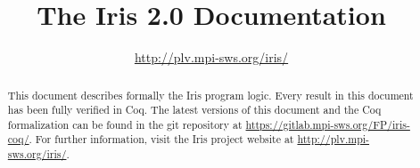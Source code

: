 \documentclass[10pt]{article}
\title{\bfseries The Iris 2.0 Documentation}
\author{\url{http://plv.mpi-sws.org/iris/}}
\begin{document}
\maketitle
\thispagestyle{empty}
\vfill
\begin{abstract}
This document describes formally the Iris program logic.
Every result in this document has been fully verified in Coq.
The latest versions of this document and the Coq formalization can be found in the git repository at \url{https://gitlab.mpi-sws.org/FP/iris-coq/}.
For further information, visit the Iris project website at \url{http://plv.mpi-sws.org/iris/}.
\end{abstract}

\clearpage
\tableofcontents

\clearpage\begingroup

\endgroup\clearpage\begingroup

\endgroup\clearpage\begingroup

\endgroup\clearpage\begingroup

\endgroup\clearpage\begingroup

\endgroup\clearpage\begingroup

\endgroup\clearpage\begingroup

\endgroup\clearpage\begingroup

\endgroup\clearpage\begingroup
\printbibliography
\endgroup
\end{document}
